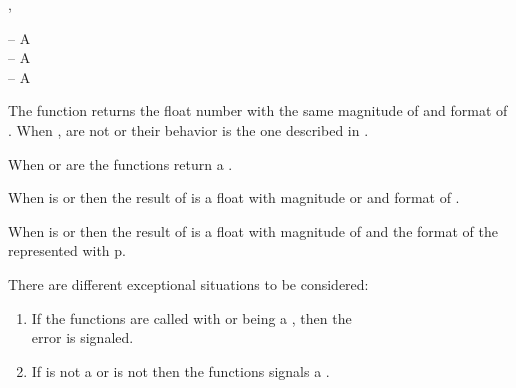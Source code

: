 \documentclass[../Type-Manipulation-Coercion.tex]{subfiles}
\begin{document}

\DSyntax{}

 ,  \RArrow {}

\DArgsNValues{}

 -- A \\
 -- A \\
 -- A \\

\DDescription{}

The function returns the float number  with the same magnitude of
 and format of . When
,  are not  or 
their behavior is the one described in \cite{1996:ANSIHyperSpec}.

\noindent
When  or  are
 the functions return a .

\noindent
When  is  or
 then the result of  is a float
with magnitude  or and
format of .

\noindent
When  is  or
 then the result of  is a float
with magnitude of  and the format of the 
represented with p.

\DExceptional{}

There are different exceptional situations to be considered:
\begin{enumerate}
\item If the functions are called with
   or  being a
  , then the\\
   error is signaled.
\item If  is not a \CL{}  or  is
  not \CL{}  then the functions signals a
  .
\end{enumerate}
\end{document}
